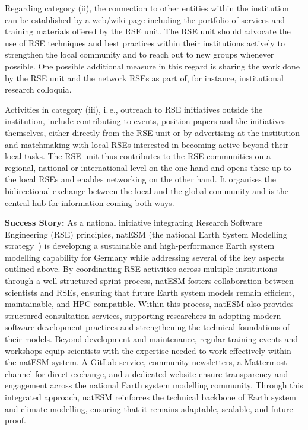 \documentclass[a4paper]{article}
\newcommand*{\ie}{i.\,e.,\xspace}
\begin{document}
Regarding category (ii), the connection to other entities within the institution can be established by a web/wiki page including the portfolio of services and training materials offered by the RSE unit.
The RSE unit should advocate the use of RSE techniques and best practices within their institutions actively to strengthen the local community and to reach out to new groups whenever possible.
One possible additional measure in this regard is sharing the work done by the RSE unit and the network RSEs as part of, for instance, institutional research colloquia.

Activities in category (iii), \ie{} outreach to RSE initiatives outside the institution, include contributing to events, position papers and the initiatives themselves, either directly from the RSE unit or by advertising at the institution and matchmaking with local RSEs interested in becoming active beyond their local tasks.
The RSE unit thus contributes to the RSE communities on a regional, national or international level on the one hand and opens these up to the local RSEs and enables networking on the other hand.
It organises the bidirectional exchange between the local and the global community and is the central hub for information coming both ways.

\begin{mdframed}
\textbf{Success Story:} As a national initiative integrating Research Software Engineering (RSE) principles, natESM (the national Earth System Modelling strategy~\autocite{Ehlert2025}) is developing a sustainable and high-performance Earth system modelling capability for Germany while addressing several of the key aspects outlined above.
By coordinating RSE activities across multiple institutions through a well-structured sprint process, natESM fosters collaboration between scientists and RSEs, ensuring that future Earth system models remain efficient, maintainable, and HPC-compatible.
Within this process, natESM also provides structured consultation services, supporting researchers in adopting modern software development practices and strengthening the technical foundations of their models.
Beyond development and maintenance, regular training events and workshops equip scientists with the expertise needed to work effectively within the natESM system.
A GitLab service, community newsletters, a Mattermost channel for direct exchange, and a dedicated website ensure transparency and engagement across the national Earth system modelling community.
Through this integrated approach, natESM reinforces the technical backbone of Earth system and climate modelling, ensuring that it remains adaptable, scalable, and future-proof.
\end{mdframed}
\end{document}
